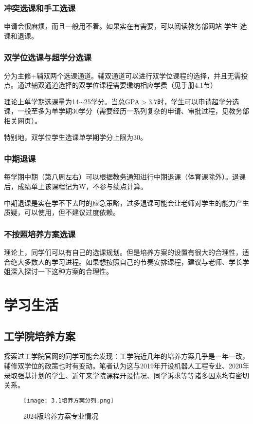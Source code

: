 \documentclass[11pt,oneside]{book}
\begin{document}
\subsection{冲突选课和手工选课}
申请会很麻烦，而且一般用不着。如果实在有需要，可以阅读教务部网站-学生-选课和退课。

\subsection{双学位选课与超学分选课}
分为主修+辅双两个选课通道。辅双通道可以进行双学位课程的选择，并且无需投点。通过辅双通道选择的双学位课程需要缴纳相应学费（见手册4.1节）

理论上单学期选课量为14$\sim$25学分。当总GPA$>$3.7时，学生可以申请超学分选课，一般至多为单学期30学分（需要经历一系列复杂的申请、审批过程，见教务部相关网页）。

特别地，双学位学生选课单学期学分上限为30。

\subsection{中期退课}
每学期中期（第八周左右）可以根据教务通知进行中期退课（体育课除外）。退课后，成绩单上该课程记为W，不参与绩点计算。

中期退课是实在学不下去时的应急策略，过多退课可能会让老师对学生的能力产生质疑，可以使用，但不建议过度依赖。

\subsection{不按照培养方案选课}
理论上，同学们可以有自己的选课规划。但是培养方案的设置有很大的合理性，适合绝大多数人的学习进程。如果想按照自己的节奏安排课程，建议与老师、学长学姐深入探讨一下这种方案的合理性。

\chapter{学习生活}
\section{工学院培养方案}
探索过工学院官网的同学可能会发现：工学院近几年的培养方案几乎是一年一改，辅修双学位的政策也时有变动。笔者认为这与2019年开设机器人工程专业、2020年录取强基计划的学生、近年来学院课程开设情况、同学诉求等等诸多因素均有密切关系。



\begin{figure}[htbp]
    \centering
    \texttt{[image: 3.1培养方案分列.png]}
    \renewcommand{\figurename}{图}
    \caption{2024版培养方案专业情况}
    \label{fig:enter-label}
\end{figure}
\end{document}

